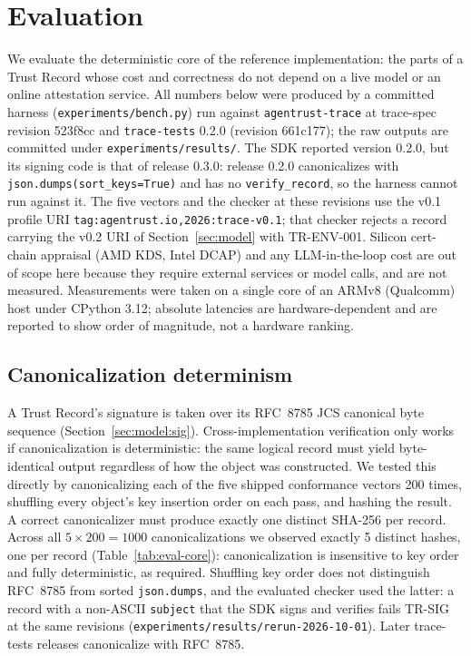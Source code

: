 \section{Evaluation}
\label{sec:eval}

We evaluate the deterministic core of the reference implementation: the parts of
a Trust Record whose cost and correctness do not depend on a live model or an
online attestation service. All numbers below were produced by a committed
harness (\texttt{experiments/bench.py}) run against \texttt{agentrust-trace} at
trace-spec revision 523f8cc and \texttt{trace-tests} 0.2.0 (revision 661c177);
the raw outputs are committed under \texttt{experiments/results/}. The SDK
reported version 0.2.0, but its signing code is that of release 0.3.0: release
0.2.0 canonicalizes with \texttt{json.dumps(sort\_keys=True)} and has no
\texttt{verify\_record}, so the harness cannot run against it. The five vectors
and the checker at these revisions use the v0.1 profile URI
\texttt{tag:agentrust.io,2026:trace-v0.1}; that checker rejects a record
carrying the v0.2 URI of Section~\ref{sec:model} with TR-ENV-001. Silicon
cert-chain appraisal (AMD KDS, Intel DCAP) and any LLM-in-the-loop cost are out
of scope here because they require external services or model calls, and are not
measured. Measurements were taken on a single core of an ARMv8 (Qualcomm) host
under CPython 3.12; absolute latencies are hardware-dependent and are reported to
show order of magnitude, not a hardware ranking.

\subsection{Canonicalization determinism}

A Trust Record's signature is taken over its RFC~8785 JCS canonical byte
sequence (Section~\ref{sec:model:sig}). Cross-implementation verification only
works if canonicalization is deterministic: the same logical record must yield
byte-identical output regardless of how the object was constructed. We tested
this directly by canonicalizing each of the five shipped conformance vectors 200
times, shuffling every object's key insertion order on each pass, and hashing the
result. A correct canonicalizer must produce exactly one distinct SHA-256 per
record. Across all $5 \times 200 = 1000$ canonicalizations we observed exactly 5
distinct hashes, one per record (Table~\ref{tab:eval-core}): canonicalization is
insensitive to key order and fully deterministic, as required. Shuffling key
order does not distinguish RFC~8785 from sorted \texttt{json.dumps}, and the
evaluated checker used the latter: a record with a non-ASCII \texttt{subject}
that the SDK signs and verifies fails TR-SIG at the same revisions
(\texttt{experiments/results/rerun-2026-10-01}). Later trace-tests releases
canonicalize with RFC~8785.

